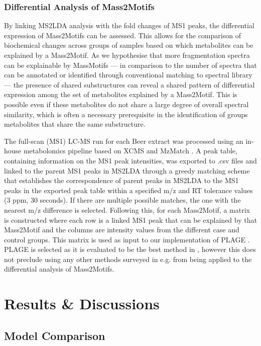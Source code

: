 \subsubsection{Differential Analysis of Mass2Motifs}

By linking MS2LDA analysis with the fold changes of MS1 peaks, the differential expression of Mass2Motifs can be assessed. This allows for the comparison of biochemical changes across groups of samples based on which metabolites can be explained by a Mass2Motif. As we hypothesise that more fragmentation spectra can be explainable by MassMotifs --- in comparison to the number of spectra that can be annotated or identified through conventional matching to spectral library --- the presence of shared substructures can reveal a shared pattern of differential expression among the set of metabolites explained by a Mass2Motif. This is possible even if these metabolites do not share a large degree of overall spectral similarity, which is often a necessary prerequisite in the identification of groups metabolites that share the same substructure. 

The full-scan (MS1) LC-MS run for each Beer extract was processed using an in-house metabolomics pipeline based on XCMS \cite{Smith2006} and MzMatch \cite{Scheltema2011}. A peak table, containing information on the MS1 peak intensities, was exported to .csv files and linked to the parent MS1 peaks in MS2LDA through a greedy matching scheme that establishes the correspondence of parent peaks in MS2LDA to the MS1 peaks in the exported peak table within a specified m/z and RT tolerance values (3 ppm, 30 seconds). If there are multiple possible matches, the one with the nearest m/z difference is selected. Following this, for each Mass2Motif, a matrix is constructed where each row is a linked MS1 peak that can be explained by that Mass2Motif and the columns are intensity values from the different case and control groups. This matrix is used as input to our implementation of PLAGE \cite{tomfohr2005pathway}. PLAGE is selected as it is evaluated to be the best method in \cite{tarca2013comparison}, however this does not preclude using any other methods surveyed in e.g. \cite{tarca2013comparison} from being applied to the differential analysis of Mass2Motifs.

\section{Results \& Discussions}

\subsection{Model Comparison\label{sub:lda-model-comparison}}

